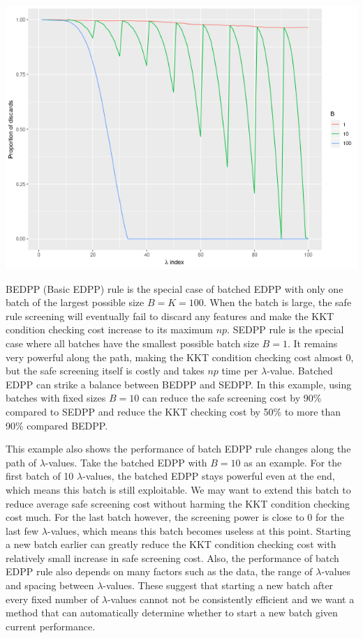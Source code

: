 \documentclass{article}
\begin{document}
\begin{center}
    \includegraphics[scale = 0.5]{plots/batchsizes.png}
\end{center}

BEDPP (Basic EDPP) rule is the special case of batched EDPP with only one batch of the largest possible size $B=K=100$. When the batch is large, the safe rule screening will eventually fail to discard any features and make the KKT condition checking cost increase to its maximum $np$. SEDPP rule is the special case where all batches have the smallest possible batch size $B=1$. It remains very powerful along the path, making the KKT condition checking cost almost 0, but the safe screening itself is costly and takes $np$ time per $\lambda$-value. Batched EDPP can strike a balance between BEDPP and SEDPP. In this example, using batches with fixed sizes $B=10$ can reduce the safe screening cost by 90\% compared to SEDPP and reduce the KKT checking cost by 50\% to more than 90\% compared BEDPP.

This example also shows the performance of batch EDPP rule changes along the path of $\lambda$-values. Take the batched EDPP with $B=10$ as an example. For the first batch of 10 $\lambda$-values, the batched EDPP stays powerful even at the end, which means this batch is still exploitable. We may want to extend this batch to reduce average safe screening cost without harming the KKT condition checking cost much. For the last batch however, the screening power is close to 0 for the last few $\lambda$-values, which means this batch becomes useless at this point. Starting a new batch earlier can greatly reduce the KKT condition checking cost with relatively small increase in safe screening cost. Also, the performance of batch EDPP rule also depends on many factors such as the data, the range of $\lambda$-values and spacing between $\lambda$-values. These suggest that starting a new batch after every fixed number of $\lambda$-values cannot not be consistently efficient and we want a method that can automatically determine whether to start a new batch given current performance.
\end{document}
